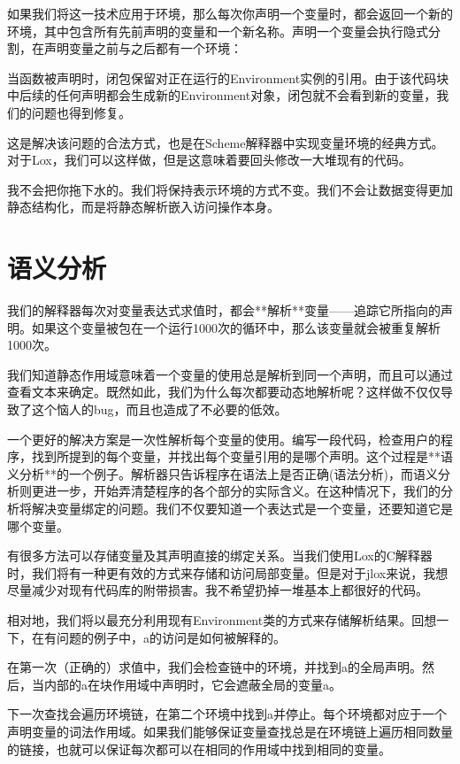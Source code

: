 \documentclass[cn,11pt,chinese]{elegantbook}
\begin{document}
{如果我们将这一技术应用于环境，那么每次你声明一个变量时，都会返回一个新的环境，其中包含所有先前声明的变量和一个新名称。声明一个变量会执行隐式分割，在声明变量之前与之后都有一个环境：

当函数被声明时，闭包保留对正在运行的Environment实例的引用。由于该代码块中后续的任何声明都会生成新的Environment对象，闭包就不会看到新的变量，我们的问题也得到修复。

这是解决该问题的合法方式，也是在Scheme解释器中实现变量环境的经典方式。对于Lox，我们可以这样做，但是这意味着要回头修改一大堆现有的代码。

我不会把你拖下水的。我们将保持表示环境的方式不变。我们不会让数据变得更加静态结构化，而是将静态解析嵌入访问操作本身。

\section{语义分析}

我们的解释器每次对变量表达式求值时，都会**解析**变量——追踪它所指向的声明。如果这个变量被包在一个运行1000次的循环中，那么该变量就会被重复解析1000次。

我们知道静态作用域意味着一个变量的使用总是解析到同一个声明，而且可以通过查看文本来确定。既然如此，我们为什么每次都要动态地解析呢？这样做不仅仅导致了这个恼人的bug，而且也造成了不必要的低效。

一个更好的解决方案是一次性解析每个变量的使用。编写一段代码，检查用户的程序，找到所提到的每个变量，并找出每个变量引用的是哪个声明。这个过程是**语义分析**的一个例子。解析器只告诉程序在语法上是否正确(语法分析)，而语义分析则更进一步，开始弄清楚程序的各个部分的实际含义。在这种情况下，我们的分析将解决变量绑定的问题。我们不仅要知道一个表达式是一个变量，还要知道它是哪个变量。

有很多方法可以存储变量及其声明直接的绑定关系。当我们使用Lox的C解释器时，我们将有一种更有效的方式来存储和访问局部变量。但是对于jlox来说，我想尽量减少对现有代码库的附带损害。我不希望扔掉一堆基本上都很好的代码。

相对地，我们将以最充分利用现有Environment类的方式来存储解析结果。回想一下，在有问题的例子中，a的访问是如何被解释的。

在第一次（正确的）求值中，我们会检查链中的环境，并找到a的全局声明。然后，当内部的a在块作用域中声明时，它会遮蔽全局的变量a。

下一次查找会遍历环境链，在第二个环境中找到a并停止。每个环境都对应于一个声明变量的词法作用域。如果我们能够保证变量查找总是在环境链上遍历相同数量的链接，也就可以保证每次都可以在相同的作用域中找到相同的变量。

}
\end{document}
